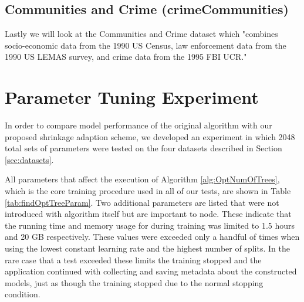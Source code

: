 \documentclass[9pt, conference]{IEEEtran}
\begin{document}
\subsection{Communities and Crime (crimeCommunities)}
Lastly we will look at the Communities and Crime dataset which "combines socio-economic data from the 1990 US Census, law enforcement data from the 1990 US LEMAS survey, and crime 
data from the 1995 FBI UCR." \cite{crimeCommunities} 

\section {Parameter Tuning Experiment}
In order to compare model performance of the original algorithm with our proposed shrinkage adaption scheme, we developed an experiment in which 2048 total sets of parameters were tested on the four datasets described in Section \ref{sec:datasets}. 

All parameters that affect the execution of Algorithm \ref{alg:OptNumOfTrees}, which is the core training procedure used in all of our tests, are shown in Table \ref{tab:findOptTreeParam}. Two additional parameters are listed that were not introduced with algorithm itself but are important to node. These indicate that the running time and memory usage for during training was limited to 1.5 hours and 20 GB respectively. These values were exceeded only a handful of times when using the lowest constant learning rate and the highest number of splits. In the rare case that a test exceeded these limits the training stopped and the application continued with collecting and saving metadata about the constructed models, just as though the training stopped due to the normal stopping condition.
\end{document}
